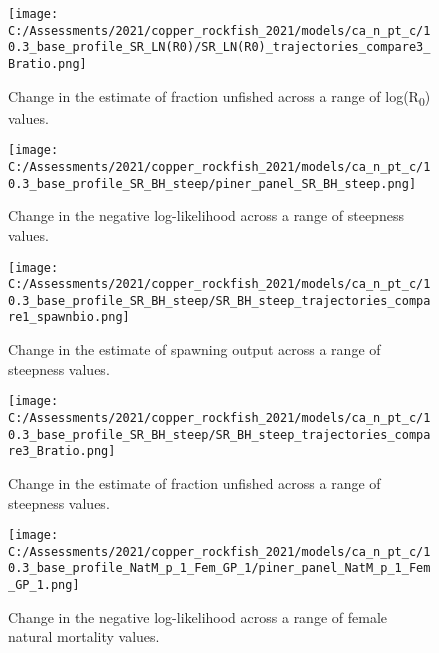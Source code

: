 \documentclass[11pt,
  english,
  a4paper,
]{article}
\begin{document}
\begin{figure}
\centering
\texttt{[image: C:/Assessments/2021/copper\_rockfish\_2021/models/ca\_n\_pt\_c/10.3\_base\_profile\_SR\_LN(R0)/SR\_LN(R0)\_trajectories\_compare3\_Bratio.png]}
\caption{Change in the estimate of fraction unfished across a range of log(R\textsubscript{0}) values.\label{fig:r0-depl}}
\end{figure}

\tagmcend\tagstructend


\begin{figure}
\centering
\texttt{[image: C:/Assessments/2021/copper\_rockfish\_2021/models/ca\_n\_pt\_c/10.3\_base\_profile\_SR\_BH\_steep/piner\_panel\_SR\_BH\_steep.png]}
\caption{Change in the negative log-likelihood across a range of steepness values.\label{fig:h-profile}}
\end{figure}

\tagmcend\tagstructend


\begin{figure}
\centering
\texttt{[image: C:/Assessments/2021/copper\_rockfish\_2021/models/ca\_n\_pt\_c/10.3\_base\_profile\_SR\_BH\_steep/SR\_BH\_steep\_trajectories\_compare1\_spawnbio.png]}
\caption{Change in the estimate of spawning output across a range of steepness values.\label{fig:h-ssb}}
\end{figure}

\tagmcend\tagstructend


\begin{figure}
\centering
\texttt{[image: C:/Assessments/2021/copper\_rockfish\_2021/models/ca\_n\_pt\_c/10.3\_base\_profile\_SR\_BH\_steep/SR\_BH\_steep\_trajectories\_compare3\_Bratio.png]}
\caption{Change in the estimate of fraction unfished across a range of steepness values.\label{fig:h-depl}}
\end{figure}

\tagmcend\tagstructend


\begin{figure}
\centering
\texttt{[image: C:/Assessments/2021/copper\_rockfish\_2021/models/ca\_n\_pt\_c/10.3\_base\_profile\_NatM\_p\_1\_Fem\_GP\_1/piner\_panel\_NatM\_p\_1\_Fem\_GP\_1.png]}
\caption{Change in the negative log-likelihood across a range of female natural mortality values.\label{fig:m-profile}}
\end{figure}
\end{document}
